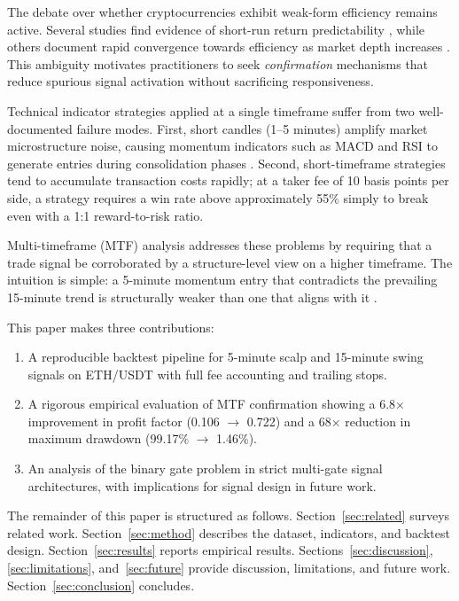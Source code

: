 \documentclass[conference]{IEEEtran}
\begin{document}
The debate over whether cryptocurrencies exhibit
weak-form efficiency remains active. Several studies find
evidence of short-run return predictability
\cite{urquhart2016inefficiency, tran2019market}, while
others document rapid convergence towards efficiency as
market depth increases \cite{sensoy2019inefficiency}.
This ambiguity motivates practitioners to seek
\emph{confirmation} mechanisms that reduce spurious signal
activation without sacrificing responsiveness.

Technical indicator strategies applied at a single
timeframe suffer from two well-documented failure modes.
First, short candles (1--5 minutes) amplify market
microstructure noise, causing momentum indicators such as
MACD and RSI to generate entries during consolidation
phases \cite{achelis2001technical}. Second, short-timeframe
strategies tend to accumulate transaction costs rapidly;
at a taker fee of 10 basis points per side, a strategy
requires a win rate above approximately 55\% simply to
break even with a 1:1 reward-to-risk ratio.

Multi-timeframe (MTF) analysis addresses these problems
by requiring that a trade signal be corroborated by a
structure-level view on a higher timeframe. The intuition
is simple: a 5-minute momentum entry that contradicts the
prevailing 15-minute trend is structurally weaker than one
that aligns with it \cite{murphy1999technical}.

This paper makes three contributions:
\begin{enumerate}
  \item A reproducible backtest pipeline for 5-minute
        scalp and 15-minute swing signals on ETH/USDT with
        full fee accounting and trailing stops.
  \item A rigorous empirical evaluation of MTF
        confirmation showing a 6.8$\times$ improvement in
        profit factor (0.106 $\to$ 0.722) and a 68$\times$
        reduction in maximum drawdown (99.17\% $\to$ 1.46\%).
  \item An analysis of the binary gate problem in strict
        multi-gate signal architectures, with implications
        for signal design in future work.
\end{enumerate}

The remainder of this paper is structured as follows.
Section~\ref{sec:related} surveys related work.
Section~\ref{sec:method} describes the dataset, indicators,
and backtest design. Section~\ref{sec:results} reports
empirical results. Sections~\ref{sec:discussion},
\ref{sec:limitations}, and~\ref{sec:future} provide
discussion, limitations, and future work. Section~\ref{sec:conclusion}
concludes.
\end{document}
